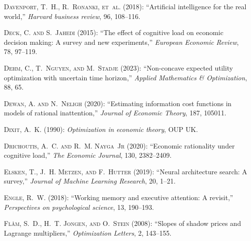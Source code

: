 \begin{thebibliography}{1}
\textsc{Davenport, T.~H., R.~Ronanki, et~al.} (2018): \enquote{Artificial intelligence for the real world,} \emph{Harvard business review}, 96, 108--116.

\textsc{Deck, C. and S.~Jahedi} (2015): \enquote{The effect of cognitive load on economic decision making: A survey and new experiments,} \emph{European Economic Review}, 78, 97--119.

\textsc{Dehm, C., T.~Nguyen, and M.~Stadje} (2023): \enquote{Non-concave expected utility optimization with uncertain time horizon,} \emph{Applied Mathematics \& Optimization}, 88, 65.

\textsc{Dewan, A. and N.~Neligh} (2020): \enquote{Estimating information cost functions in models of rational inattention,} \emph{Journal of Economic Theory}, 187, 105011.

\textsc{Dixit, A.~K.} (1990): \emph{Optimization in economic theory}, OUP UK.

\textsc{Drichoutis, A.~C. and R.~M. Nayga~Jr} (2020): \enquote{Economic rationality under cognitive load,} \emph{The Economic Journal}, 130, 2382--2409.

\textsc{Elsken, T., J.~H. Metzen, and F.~Hutter} (2019): \enquote{Neural architecture search: A survey,} \emph{Journal of Machine Learning Research}, 20, 1--21.

\textsc{Engle, R.~W.} (2018): \enquote{Working memory and executive attention: A revisit,} \emph{Perspectives on psychological science}, 13, 190--193.

\textsc{Fl{\aa}m, S.~D., H.~T. Jongen, and O.~Stein} (2008): \enquote{Slopes of shadow prices and Lagrange multipliers,} \emph{Optimization Letters}, 2, 143--155.


\end{thebibliography}
